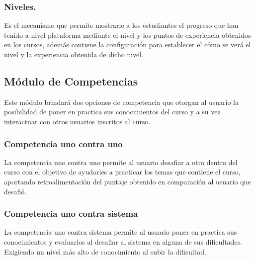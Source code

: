 \subsubsection{Niveles.}

 Es el mecanismo que permite mostrarle a los estudiantes el progreso que han tenido
 a nivel plataforma mediante el nivel y los puntos de experiencia obtenidos en
 los cursos, además contiene la configuración para establecer el cómo se verá el
 nivel y la experiencia obtenida de dicho nivel.

%

\subsection{Módulo de Competencias}

  Este módulo brindará dos opciones de competencia que otorgan al usuario
  la posibilidad de poner en practica sus conocimientos del curso y a su vez interactuar
  con otros usuarios inscritos al curso.

\subsubsection{Competencia uno contra uno}

La competencia uno contra uno permite al usuario desafiar a otro dentro del curso con
el objetivo de ayudarles a practicar los temas que contiene el curso, aportando retroalimentación
del puntaje obtenido en comparación al usuario que desafió.

\subsubsection{Competencia uno contra sistema}

La competencia uno contra sistema permite al usuario poner en practica sus conocimientos y evaluarlos
al desafiar al sistema en alguna de sus dificultades. Exigiendo un nivel más alto de conocimiento al
subir la dificultad.

%

